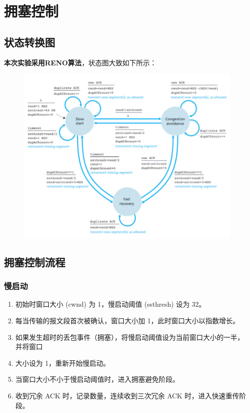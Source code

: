 \documentclass[UTF8,a4paper,10pt]{ctexart}
\begin{document}
\section{拥塞控制}
\subsection{状态转换图}
\textbf{本次实验采用RENO算法}，状态图大致如下所示：
\begin{figure}[H]
    \centering
    \includegraphics[scale=0.6]{cn3.png}
    \label{fig:3}
\end{figure}
\subsection{拥塞控制流程}
\subsubsection{慢启动}
\begin{enumerate}
  \item 初始时窗口大小 (cwnd) 为 1，慢启动阈值 (ssthresh) 设为 32。
  \item 每当传输的报文段首次被确认，窗口大小加 1，此时窗口大小以指数增长。
  \item 如果发生超时的丢包事件（拥塞），将慢启动阈值设为当前窗口大小的一半，并将窗口
  \item 大小设为 1，重新开始慢启动。
  \item 当窗口大小不小于慢启动阈值时，进入拥塞避免阶段。
  \item 收到冗余 ACK 时，记录数量，连续收到三次冗余 ACK 时，进入快速重传阶段。
\end{enumerate}
\end{document}
